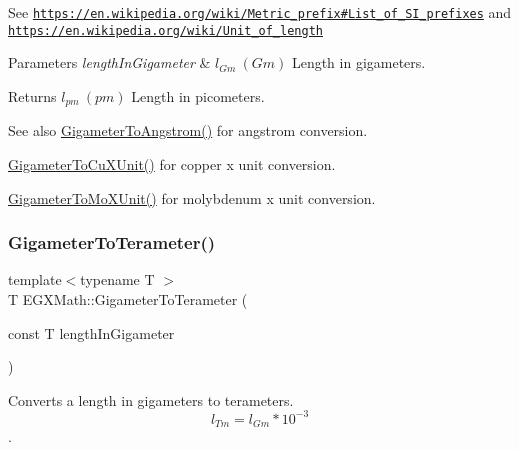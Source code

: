 See \href{https://en.wikipedia.org/wiki/Metric_prefix#List_of_SI_prefixes}{\tt https\+://en.\+wikipedia.\+org/wiki/\+Metric\+\_\+prefix\#\+List\+\_\+of\+\_\+\+S\+I\+\_\+prefixes} and \href{https://en.wikipedia.org/wiki/Unit_of_length}{\tt https\+://en.\+wikipedia.\+org/wiki/\+Unit\+\_\+of\+\_\+length} 
\begin{DoxyParams}{Parameters}
{\em length\+In\+Gigameter} & $ l_{Gm}\ (Gm)$ Length in gigameters. \\
\hline
\end{DoxyParams}
\begin{DoxyReturn}{Returns}
$ l_{pm}\ (pm)$ Length in picometers. 
\end{DoxyReturn}
\begin{DoxySeeAlso}{See also}
\mbox{\hyperlink{group___e_g_x_math-_conversions-_length_conversions-_gigameter-_non-_s_i_ga622e85e3f663039f3802b29d25655989}{Gigameter\+To\+Angstrom()}} for angstrom conversion. 

\mbox{\hyperlink{group___e_g_x_math-_conversions-_length_conversions-_gigameter-_non-_s_i_gab542297b31676ef5b3cf62f0c63a6f20}{Gigameter\+To\+Cu\+X\+Unit()}} for copper x unit conversion. 

\mbox{\hyperlink{group___e_g_x_math-_conversions-_length_conversions-_gigameter-_non-_s_i_gac30ae06633de77b05d859ffb3cd2a577}{Gigameter\+To\+Mo\+X\+Unit()}} for molybdenum x unit conversion. 
\end{DoxySeeAlso}
\mbox{\label{group___e_g_x_math-_conversions-_length_conversions-_gigameter-_s_i_ga7cab1971a673d663a4eadd070afedf7e}} 
\subsubsection{\texorpdfstring{Gigameter\+To\+Terameter()}{GigameterToTerameter()}}
{\footnotesize\ttfamily template$<$typename T $>$ \\
T E\+G\+X\+Math\+::\+Gigameter\+To\+Terameter (\begin{DoxyParamCaption}\item[{const T}]{length\+In\+Gigameter }\end{DoxyParamCaption})}



Converts a length in gigameters to terameters. \[ l_{Tm}=l_{Gm} * 10^{-3} \]. 

